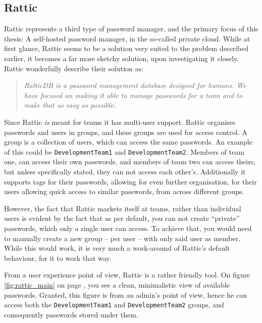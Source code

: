 		\subsection*{Rattic}
			Rattic\cite{rattic_frontpage} represents a third type of password manager, and the primary focus of this thesis: A self-hosted password manager, in the so-called private cloud. While at first glance, Rattic seems to be a solution very suited to the problem described earlier, it becomes a far more sketchy solution, upon investigating it closely. Rattic wonderfully describe their solution as:

			\begin{quote}
				\emph{RatticDB is a password management database designed for humans. We have focused on making it able to manage passwords for a team and to make that as easy as possible.}\\\cite{rattic_frontpage}
			\end{quote}

			Since Rattic \emph{is} meant for teams it has multi-user support. Rattic organises passwords and users in groups, and these groups are used for access control. A group is a collection of users, which can access the same passwords. An example of this could be \verb=DevelopmentTeam1= and \verb=DevelopmentTeam2=. Members of team one, can access their own passwords, and members of team two can access theirs, but unless specifically stated, they can not access each other's. Additionally it supports tags for their passwords, allowing for even further organisation, for their users allowing quick access to similar passwords, from across different groups.

			However, the fact that Rattic markets itself at teams, rather than individual users is evident by the fact that as per default, you can not create ``private'' passwords, which only a single user can access. To achieve that, you would need to manually create a new group -- per user -- with only said user as member. While this would work, it is very much a work-around of Rattic's default behaviour, for it to work that way.

			From a user experience point of view, Rattic is a rather friendly tool. On figure \ref{fig:rattic_main} on page \pageref{fig:rattic_main}, you see a clean, minimalistic view of available passwords. Granted, this figure is from an admin's point of view, hence he can access both the \verb=DevelopmentTeam1= and \verb=DevelopmentTeam2= groups, and consequently passwords stored under them.

